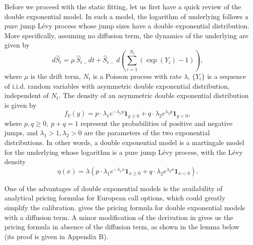 \documentclass{article}
\numberwithin{equation}{section}
\def\bone{\mathbf{1}}
\begin{document}
Before we proceed with the static fitting, let us first have a quick review of the double exponential model. In such a model, the logarithm of underlying follows a pure jump L\'evy process whose jump sizes have a double exponential distribution. More specifically, assuming no diffusion term, the dynamics of the underlying are given by
\begin{equation} \label{fo:implementation:kou}
d\hat{S}_t = \mu\, \hat{S}_{t-} dt + \hat{S}_{t-}\,  d \left(\sum_{i=1}^{N_t}(\exp(Y_i) - 1)\right),
\end{equation}
where $\mu$ is the drift term, $N_t$ is a Poisson process with rate $\lambda$, $\{Y_i\}$ is a sequence of i.i.d. random variables with asymmetric double exponential distribution, independent of $N_t$. The density of an asymmetric double exponential distribution is given by
\begin{equation}
f_Y(y) = p \cdot \lambda_1 e^{-\lambda_1 y} \bone_{y\geq 0} + q \cdot \lambda_2 e^{\lambda_2 y} \bone_{y < 0},
\end{equation}
where $p,q \geq 0, \ p+q = 1$ represent the probabilities of positive and negative jumps, and $\lambda_1 > 1, \lambda_2 > 0$ are the parameters of the two exponential distributions. In other words, a double exponential model is a martingale model for the underlying whose logarithm is a pure jump L\'evy process, with the L\'{e}vy density
\begin{equation}\label{fo:implementation:kou_eta}
\eta(x) = \lambda ( p \cdot \lambda_1 e^{-\lambda_1 x} \bone_{x\geq 0} + q \cdot \lambda_2 e^{\lambda_2 x} \bone_{x < 0} ).
\end{equation}

One of the advantages of double exponential models is the availability of analytical pricing formulas for European call options, which could greatly simplify the calibration. \cite{Kou2002model} gives the pricing formula for double exponential models with a diffusion term. A minor modification of the derivation in \cite{Kou2002model} gives us the pricing formula in absence of the diffusion term, as shown in the lemma below (its proof is given in Appendix B).
\end{document}

